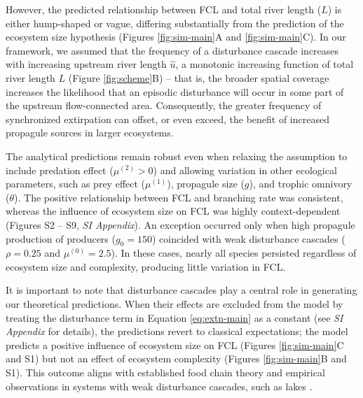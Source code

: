 \documentclass[11pt, class=article, crop=false]{standalone}
\begin{document}
\vspace{0.5cm}

\vspace{0.5cm}

However, the predicted relationship between FCL and total river length ($L$) is either hump-shaped or vague, differing substantially from the prediction of the ecosystem size hypothesis (Figures \ref{fig:sim-main}A and \ref{fig:sim-main}C).
In our framework, we assumed that the frequency of a disturbance cascade increases with increasing upstream river length $\hat{u}$, a monotonic increasing function of total river length $L$ (Figure \ref{fig:scheme}B) -- that is, the broader spatial coverage increases the likelihood that an episodic disturbance will occur in some part of the upstream flow-connected area.
Consequently, the greater frequency of synchronized extirpation can offset, or even exceed, the benefit of increased propagule sources in larger ecosystems.

The analytical predictions remain robust even when relaxing the assumption to include predation effect ($\mu^{(2)} > 0$) and allowing variation in other ecological parameters, such as prey effect ($\mu^{(1)}$), propagule size ($g$), and trophic omnivory ($\theta$).
The positive relationship between FCL and branching rate was consistent, whereas the influence of ecosystem size on FCL was highly context-dependent (Figures S2 -- S9, \textit{SI Appendix}).
An exception occurred only when high propagule production of producers ($g_0 = 150$) coincided with weak disturbance cascades ($\rho = 0.25$ and $\mu^{(0)} = 2.5$).
In these cases, nearly all species persisted regardless of ecosystem size and complexity, producing little variation in FCL.

It is important to note that disturbance cascades play a central role in generating our theoretical predictions.
When their effects are excluded from the model by treating the disturbance term in Equation \ref{eq:extn-main} as a constant (see \textit{SI Appendix} for details), the predictions revert to classical expectations; the model predicts a positive influence of ecosystem size on FCL (Figures \ref{fig:sim-main}C and S1) but not an effect of ecosystem complexity (Figures \ref{fig:sim-main}B and S1).
This outcome aligns with established food chain theory \citep{holt_food_2002, takimoto_effects_2012, terui_spatial_2019} and empirical observations in systems with weak disturbance cascades, such as lakes \citep{post_ecosystem_2000, takimoto_ecosystem_2008, doi_resource_2009}.
\end{document}

